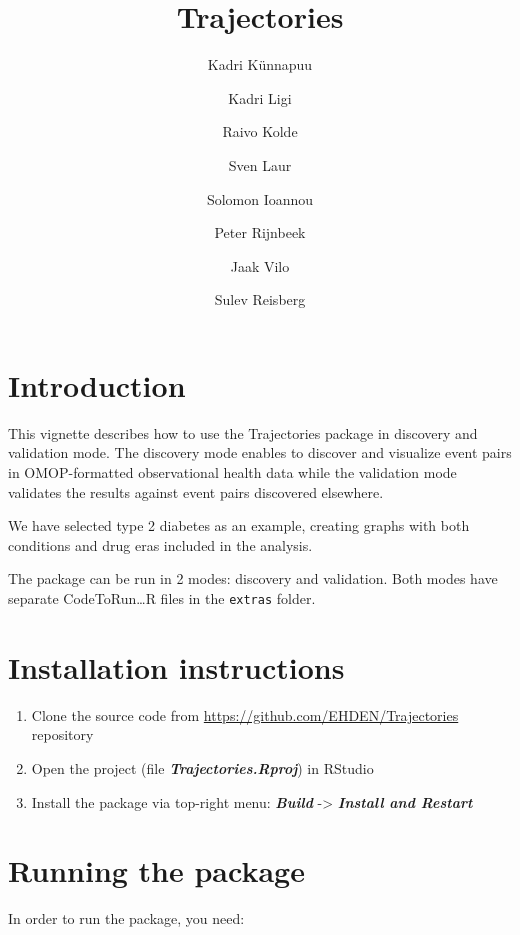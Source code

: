 \documentclass[
]{article}
\title{Trajectories}
\author{Kadri Künnapuu \and Kadri Ligi \and Raivo Kolde \and Sven
Laur \and Solomon Ioannou \and Peter Rijnbeek \and Jaak Vilo \and Sulev
Reisberg}
\date{}
\providecommand{\tightlist}{%
  \setlength{\itemsep}{0pt}\setlength{\parskip}{0pt}}
\begin{document}
\maketitle

{
\setcounter{tocdepth}{3}
\tableofcontents
}
\hypertarget{introduction}{%
\section{Introduction}\label{introduction}}

This vignette describes how to use the Trajectories package in discovery
and validation mode. The discovery mode enables to discover and
visualize event pairs in OMOP-formatted observational health data while
the validation mode validates the results against event pairs discovered
elsewhere.

We have selected type 2 diabetes as an example, creating graphs with
both conditions and drug eras included in the analysis.

The package can be run in 2 modes: discovery and validation. Both modes
have separate CodeToRun\ldots R files in the \texttt{extras} folder.

\hypertarget{installation-instructions}{%
\section{Installation instructions}\label{installation-instructions}}

\begin{enumerate}
\def\labelenumi{\arabic{enumi}.}
\tightlist
\item
  Clone the source code from \url{https://github.com/EHDEN/Trajectories}
  repository
\item
  Open the project (file \textbf{\emph{Trajectories.Rproj}}) in RStudio
\item
  Install the package via top-right menu: \textbf{\emph{Build}}
  -\textgreater{} \textbf{\emph{Install and Restart}}
\end{enumerate}

\hypertarget{running-the-package}{%
\section{Running the package}\label{running-the-package}}

In order to run the package, you need:
\end{document}
